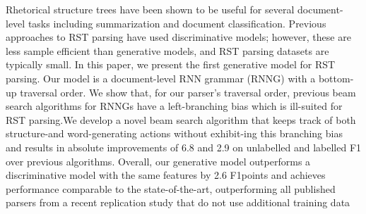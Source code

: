 Rhetorical structure trees have been shown to be useful for several document-level tasks including summarization and document classification. 
Previous approaches to RST parsing have used discriminative models; however, these are less sample efficient than generative models, and RST parsing datasets are typically small.  In this paper, we present the first generative  model for RST parsing. Our model is a document-level RNN grammar (RNNG) with a bottom-up traversal order. We show that, for our parser’s traversal order, previous beam search algorithms for RNNGs have a left-branching bias which is ill-suited for RST parsing.We develop a novel beam search algorithm  that keeps track of both structure-and word-generating actions without exhibit-ing this branching bias and results in absolute improvements of 6.8 and 2.9 on unlabelled and labelled F1 over previous algorithms. Overall, our generative model outperforms a discriminative model with the same features by 2.6 F1points and achieves performance comparable to the state-of-the-art, outperforming all published parsers from a recent replication study that do not use additional training data